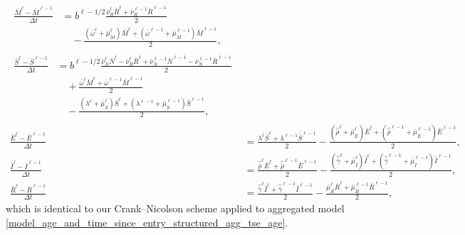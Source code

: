 \documentclass[USenglish]{article}
\begin{document}
\begin{subequations}
  \label{numerics_age_and_time_since_entry_structured_agg_tse_age}
  \begin{align}
    \begin{split}
      \frac{\bar{M}^{\ell} - \bar{M}^{\ell - 1}}{\Delta t}
      &= b^{\ell - 1 / 2} \frac{\bar{\nu}_R^{\ell} \bar{R}^{\ell}
        + \bar{\nu}_R^{\ell - 1} \bar{R}^{\ell - 1}}{2}
      \\ & \quad {}
      - \frac{(\bar{\omega}^{\ell} + \bar{\mu}_M^{\ell}) \bar{M}^{\ell}
        + (\bar{\omega}^{\ell - 1} + \bar{\mu}_M^{\ell - 1}) \bar{M}^{\ell - 1}}
      {2},
    \end{split}
    \\
    \begin{split}
      \frac{\bar{S}^{\ell} - \bar{S}^{\ell - 1}}{\Delta t}
      &= b^{\ell - 1 / 2}
      \frac{\bar{\nu}_N^{\ell} \bar{N}^{\ell}
        - \bar{\nu}_R^{\ell} \bar{R}^{\ell}
        + \bar{\nu}_N^{\ell - 1} \bar{N}^{\ell - 1}
        - \bar{\nu}_N^{\ell - 1} \bar{R}^{\ell - 1}}{2}
      \\ & \quad {}
      + \frac{\bar{\omega}^{\ell} \bar{M}^{\ell}
        + \bar{\omega}^{\ell - 1} \bar{M}^{\ell - 1}}{2}
      \\ & \quad {}
      - \frac{(\lambda^{\ell} + \bar{\mu}_S^{\ell}) \bar{S}^{\ell}
        + (\lambda^{\ell - 1} + \bar{\mu}_S^{\ell - 1}) \bar{S}^{\ell - 1}}{2},
    \end{split}
    \\
    \frac{\bar{E}^{\ell} - \bar{E}^{\ell - 1}}{\Delta t}
    &= \frac{\lambda^{\ell} \bar{S}^{\ell}
      + \lambda^{\ell - 1} \bar{S}^{\ell - 1}}{2}
      - \frac{(\hat{\bar{\rho}}^{\ell} + \bar{\mu}_E^{\ell}) \bar{E}^{\ell}
      + (\hat{\bar{\rho}}^{\ell - 1} + \bar{\mu}_E^{\ell - 1}) \bar{E}^{\ell - 1}}
    {2},
    \\
    \frac{\bar{I}^{\ell} - \bar{I}^{\ell - 1}}{\Delta t}
    &= \frac{\hat{\bar{\rho}}^{\ell} \bar{E}^{\ell}
      + \hat{\bar{\rho}}^{\ell - 1} \bar{E}^{\ell - 1}} {2}
    - \frac{(\hat{\bar{\gamma}}^{\ell} + \bar{\mu}_I^{\ell}) \bar{I}^{\ell}
      + (\hat{\bar{\gamma}}^{\ell - 1} + \bar{\mu}_I^{\ell - 1})
      \bar{I}^{\ell - 1}}
    {2},
    \\
    \frac{\bar{R}^{\ell} - \bar{R}^{\ell - 1}}{\Delta t}
    &= \frac{\hat{\bar{\gamma}}^{\ell} \bar{I}^{\ell}
      + \hat{\bar{\gamma}}^{\ell - 1} \bar{I}^{\ell - 1}}
    {2}
    - \frac{\bar{\mu}_R^{\ell} \bar{R}^{\ell}
      + \bar{\mu}_R^{\ell - 1} \bar{R}^{\ell - 1}}
    {2},
  \end{align}
\end{subequations}
which is identical to our Crank--Nicolson scheme applied to aggregated
model \eqref{model_age_and_time_since_entry_structured_agg_tse_age}.
\end{document}
